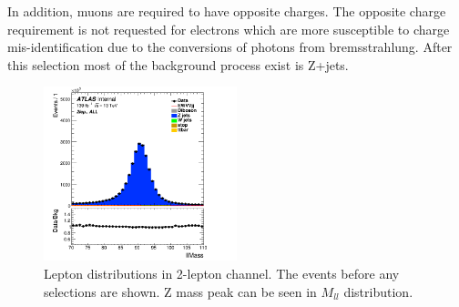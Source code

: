In addition, muons are required to have opposite charges. 
The opposite charge requirement is not requested for electrons which are more susceptible to charge mis-identification due to the conversions of photons from bremsstrahlung. After this selection most of the background process exist is Z+jets.
\begin{figure}[H]
    \centering
    \includegraphics[width=0.5\textwidth]{figures/2lep/dataMC/C_0ptag1pfat0pjet_0ptv_ALL_llMass_Lin}
    \caption{Lepton distributions in 2-lepton channel. The events before any selections are shown. Z mass peak can be seen in $M_{ll}$ distribution.}
    \label{fig:2lepLeptons}
\end{figure}
